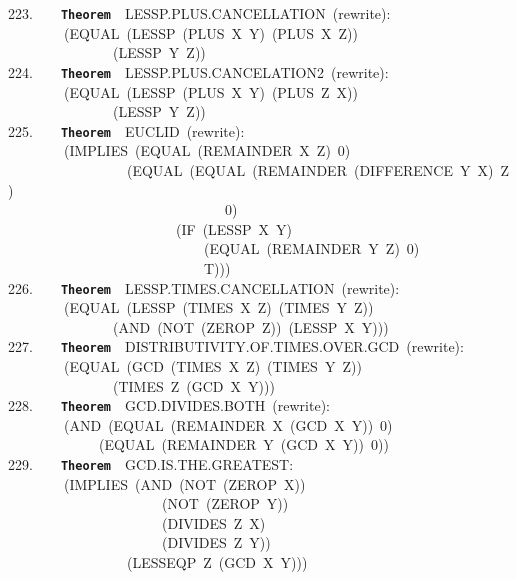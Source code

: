 \documentclass[11pt]{book}
\newenvironment{pubasis}{\begin{flushleft}\ttfamily\small}{\normalsize\rmfamily\end{flushleft}}
\newcommand{\axiomordefinition}[1]{\vspace{6pt}\texttt{\textbf{#1}}}
\begin{document}
\begin{pubasis}
223.~~~~\axiomordefinition{Theorem}~~LESSP.PLUS.CAN\-CELLATION~(rewrite):\\
~~~~~~~~(EQUAL~(LESSP~(PLUS~X~Y)~(PLUS~X~Z))\\
~~~~~~~~~~~~~~~(LESSP~Y~Z))\\

224.~~~~\axiomordefinition{Theorem}~~LESSP.PLUS.CANCELATION2~(rewrite):\\
~~~~~~~~(EQUAL~(LESSP~(PLUS~X~Y)~(PLUS~Z~X))\\
~~~~~~~~~~~~~~~(LESSP~Y~Z))\\

225.~~~~\axiomordefinition{Theorem}~~EUCLID~(rewrite):\\
~~~~~~~~(IMPLIES~(EQUAL~(REMAINDER~X~Z)~0)\\
~~~~~~~~~~~~~~~~~(EQUAL~(EQUAL~(REMAINDER~(DIFFERENCE~Y~X)~Z)\\
~~~~~~~~~~~~~~~~~~~~~~~~~~~~~~~0)\\
~~~~~~~~~~~~~~~~~~~~~~~~(IF~(LESSP~X~Y)\\
~~~~~~~~~~~~~~~~~~~~~~~~~~~~(EQUAL~(REMAINDER~Y~Z)~0)\\
~~~~~~~~~~~~~~~~~~~~~~~~~~~~T)))\\

226.~~~~\axiomordefinition{Theorem}~~LESSP.TIMES.CAN\-CELLATION~(rewrite):\\
~~~~~~~~(EQUAL~(LESSP~(TIMES~X~Z)~(TIMES~Y~Z))\\
~~~~~~~~~~~~~~~(AND~(NOT~(ZEROP~Z))~(LESSP~X~Y)))\\

227.~~~~\axiomordefinition{Theorem}~~DIS\-TRI\-BU\-TIV\-ITY.OF.TIMES.OVER.GCD~(rewrite):\\
~~~~~~~~(EQUAL~(GCD~(TIMES~X~Z)~(TIMES~Y~Z))\\
~~~~~~~~~~~~~~~(TIMES~Z~(GCD~X~Y)))\\

228.~~~~\axiomordefinition{Theorem}~~GCD.DIVIDES.BOTH~(rewrite):\\
~~~~~~~~(AND~(EQUAL~(REMAINDER~X~(GCD~X~Y))~0)\\
~~~~~~~~~~~~~(EQUAL~(REMAINDER~Y~(GCD~X~Y))~0))\\

229.~~~~\axiomordefinition{Theorem}~~GCD.IS.THE.GREAT\-EST:\\
~~~~~~~~(IMPLIES~(AND~(NOT~(ZEROP~X))\\
~~~~~~~~~~~~~~~~~~~~~~(NOT~(ZEROP~Y))\\
~~~~~~~~~~~~~~~~~~~~~~(DIVIDES~Z~X)\\
~~~~~~~~~~~~~~~~~~~~~~(DIVIDES~Z~Y))\\
~~~~~~~~~~~~~~~~~(LESSEQP~Z~(GCD~X~Y)))\\


\end{pubasis}
\end{document}
